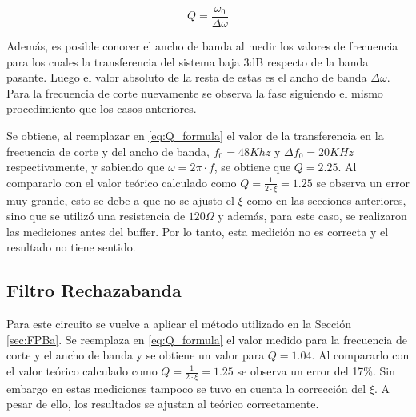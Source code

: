 \begin{equation}
    Q = \frac{\omega_0}{\Delta \omega}
    \label{eq:Q_formula}
\end{equation}

Adem\'as, es posible conocer el ancho de banda al medir los valores de frecuencia para los cuales la transferencia del sistema baja 3dB respecto de la banda pasante. Luego el valor absoluto de la resta de estas es el ancho de banda $\Delta \omega$. Para la frecuencia de corte nuevamente se observa la fase siguiendo el mismo procedimiento que los casos anteriores.

Se obtiene, al reemplazar en \ref{eq:Q_formula} el valor de la transferencia en la frecuencia de corte y del ancho de banda, $f_0 = 48Khz$ y $\Delta f_0 = 20KHz$ respectivamente, y sabiendo que $\omega = 2\pi \cdot f$, se obtiene que $Q = 2.25$. Al compararlo con el valor te\'orico calculado como $Q = \frac{1}{2 \cdot \xi} = 1.25$ se observa un error muy grande, esto se debe a que no se ajusto el 
$\xi$ como en las secciones anteriores, sino que se utiliz\'o una resistencia de $120\Omega$ y adem\'as, para este caso, se realizaron las mediciones antes del buffer. Por lo tanto, esta medici\'on no es correcta y el resultado no tiene sentido.  

\subsection{Filtro Rechazabanda}

Para este circuito se vuelve a aplicar el m\'etodo utilizado en la Secci\'on \ref{sec:FPBa}.
Se reemplaza en \ref{eq:Q_formula} el valor medido para la frecuencia de corte y el ancho de banda y se obtiene un valor para $Q = 1.04$.
 Al compararlo con el valor te\'orico calculado como $Q = \frac{1}{2 \cdot \xi} = 1.25$ se observa un error del 17\%. Sin embargo en estas mediciones tampoco se tuvo en cuenta la correcci\'on del $\xi$. A pesar de ello, los resultados se ajustan al te\'orico correctamente. 

